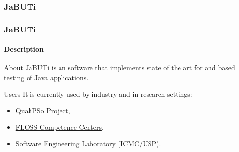 \begin{frame}[c,parent={cmap:jabuti-software-testing},hasnext=true,hasprev=false]
\frametitle{JaBUTi}
\label{cmap:jabuti}

\end{frame}


\begin{frame}[parent={cmap:jabuti},hasnext=true,hasprev=true]
\frametitle{JaBUTi}
\framesubtitle{Description}
\label{concept:jabuti}

\begin{block:concept}{About}
JaBUTi is an  software 
that implements state of the art  for
 and 
based testing of Java applications.
\end{block:concept}

\begin{block:fact}{Users}
It is currently used by industry and in research settings:
\begin{itemize}
	\item \href{http://www.qualipso.org}{QualiPSo Project},
	\item \href{http://www.flosscc.org}{FLOSS Competence Centers},
	\item \href{http://www.labes.icmc.usp.br}{Software Engineering Laboratory
	(ICMC/USP)}.
\end{itemize}
\end{block:fact}
\end{frame}
